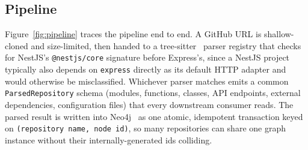\documentclass[conference]{IEEEtran}
\begin{document}
\subsection{Pipeline}
Figure~\ref{fig:pipeline} traces the pipeline end to end. A GitHub URL is shallow-cloned and
size-limited, then handed to a tree-sitter~\cite{treesitter} parser registry that checks for
NestJS's \texttt{@nestjs/core} signature before Express's, since a NestJS project typically also
depends on \texttt{express} directly as its default HTTP adapter and would otherwise be
misclassified. Whichever parser matches emits a common \texttt{ParsedRepository} schema
(modules, functions, classes, API endpoints, external dependencies, configuration files) that
every downstream consumer reads. The parsed result is written into Neo4j~\cite{neo4j} as one
atomic, idempotent transaction keyed on \texttt{(repository name, node id)}, so many
repositories can share one graph instance without their internally-generated ids colliding.
\end{document}
